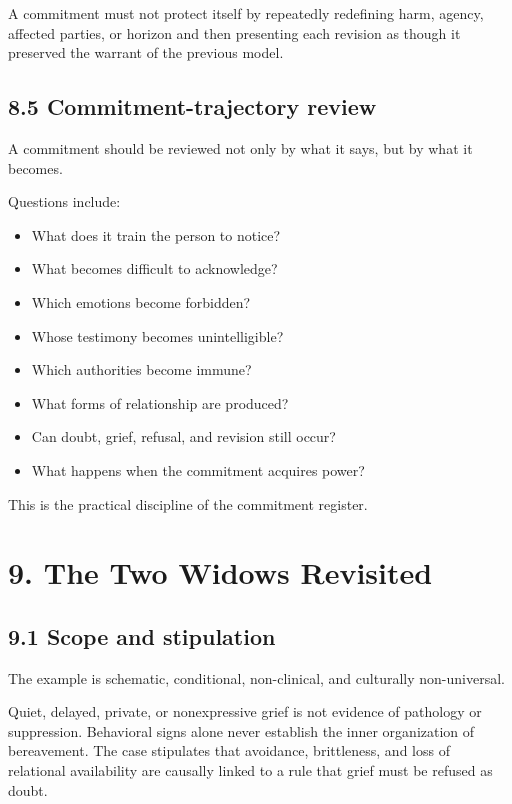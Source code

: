 \documentclass[
  11pt,
]{article}
\providecommand{\tightlist}{%
  \setlength{\itemsep}{0pt}\setlength{\parskip}{0pt}}
\begin{document}
A commitment must not protect itself by repeatedly redefining harm,
agency, affected parties, or horizon and then presenting each revision
as though it preserved the warrant of the previous model.

\subsection{8.5 Commitment-trajectory
review}\label{commitment-trajectory-review}

A commitment should be reviewed not only by what it says, but by what it
becomes.

Questions include:

\begin{itemize}
\tightlist
\item
  What does it train the person to notice?
\item
  What becomes difficult to acknowledge?
\item
  Which emotions become forbidden?
\item
  Whose testimony becomes unintelligible?
\item
  Which authorities become immune?
\item
  What forms of relationship are produced?
\item
  Can doubt, grief, refusal, and revision still occur?
\item
  What happens when the commitment acquires power?
\end{itemize}

This is the practical discipline of the commitment register.

\section{9. The Two Widows Revisited}\label{the-two-widows-revisited}

\subsection{9.1 Scope and stipulation}\label{scope-and-stipulation}

The example is schematic, conditional, non-clinical, and culturally
non-universal.

Quiet, delayed, private, or nonexpressive grief is not evidence of
pathology or suppression. Behavioral signs alone never establish the
inner organization of bereavement. The case stipulates that avoidance,
brittleness, and loss of relational availability are causally linked to
a rule that grief must be refused as doubt.
\end{document}
